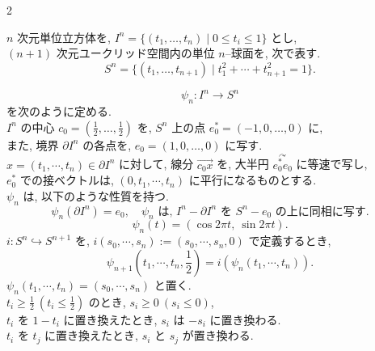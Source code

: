 \documentclass[10pt, leqno]{ltjsarticle}
\numberwithin{equation}{section}
\theoremstyle{plain}
\theoremstyle{definition}
\theoremstyle{remark}
\begin{document}
\begin{paracol}{2}

$n$ 次元単位立方体を,
\(
I^n=\{(t_1,\ldots,t_n)\mid 0\le t_i\le 1\}
\)
とし, \\
$(n+1)$ 次元ユークリッド空間内の単位 $n$–球面を, 次で表す.
\[
S^n=\{(t_1,\ldots,t_{n+1})\mid t_1^2+\cdots+t_{n+1}^2=1\}.
\]

\begin{equation}
  \psi_n:I^n\longrightarrow S^n
\end{equation}
を次のように定める. \\
$I^n$ の中心 $c_0=(\tfrac12,\ldots,\tfrac12)$ を,
$S^n$ 上の点 $e_0^*=(-1,0,\ldots,0)$ に, \\
また, 境界 $\partial I^n$ の各点を, 
$e_0=(1,0,\ldots,0)$ に写す.\\
\(x=(t_1,\cdots,t_n)\in\partial I^{n}\)
に対して, 線分
\(\overrightarrow{c_{0}x}\)
を, 大半円
\(\stackrel{\curvearrowright}{e_{0}^{*}e_{0}}\)
に等速で写し,\\
\(e_{0}^{*}\)
での接ベクトルは,
\((0,t_{1},\cdots,t_{n})\)
に平行になるものとする.\\
\(\psi_n\) は, 以下のような性質を持つ.
\begin{equation}
  \psi_n(\partial I^n) = e_0,\quad
  \psi_n \text{ は, } I^n - \partial I^n \text{ を }
  S^n - e_0 \text{ の上に同相に写す.}
\end{equation}
\[
\psi_n(t) = (\cos 2\pi t,\ \sin 2\pi t).
\]
\(i:S^{n}\hookrightarrow S^{n+1}\)
を,
\(i(s_{0},\cdots,s_{n}) := (s_{0},\cdots,s_{n},0)\)
で定義するとき,
\[
\psi_{n+1}(t_{1},\cdots,t_{n},\frac{1}{2})=
i(\psi_{n}(t_{1},\cdots,t_{n})).
\]
\(\psi_{n}(t_{1},\cdots,t_{n})=(s_{0},\cdots,s_{n})\)
と置く.\\
\(t_{i}\geq\frac{1}{2}\ (t_{i}\leq\frac{1}{2})\)
のとき,
\(s_{i}\geq0\ (s_{i}\leq0)\),\\
\(t_{i}\)
を
\(1-t_{i}\)
に置き換えたとき,
\(s_{i}\)
は
\(-s_{i}\)
に置き換わる.\\
\(t_{i}\)
を
\(t_{j}\)
に置き換えたとき,
\(s_{i}\)
と
\(s_{j}\)
が置き換わる.


\end{paracol}
\end{document}
